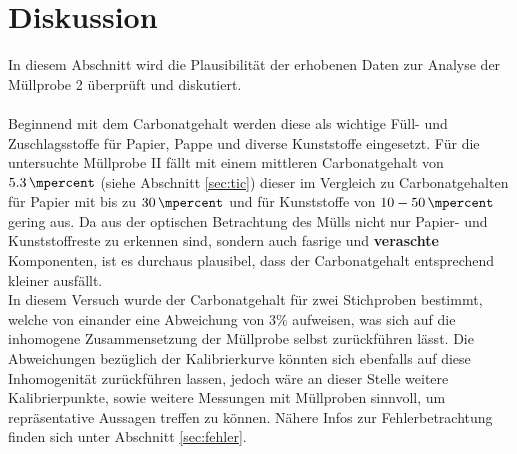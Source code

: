 \chapter{Diskussion}
\label{sec:diskussion}

In diesem Abschnitt wird die Plausibilität der erhobenen Daten zur Analyse der Müllprobe 2 überprüft und diskutiert.\\ \\
Beginnend mit dem Carbonatgehalt werden diese als wichtige Füll- und Zuschlagsstoffe für Papier, Pappe und diverse Kunststoffe eingesetzt. Für die untersuchte Müllprobe II fällt mit einem mittleren Carbonatgehalt von $\SI{5,3}{\mpercent}$ (siehe Abschnitt \ref{sec:tic}) dieser im Vergleich zu Carbonatgehalten für Papier mit bis zu $\SI{30}{\mpercent}$ \cite{Wikipedia.21.11.2019} und für Kunststoffe von $10 - \SI{50}{\mpercent}$ \cite{PolymerServiceGmbHMerseburg.13.08.2019} gering aus. Da aus der optischen Betrachtung des Mülls nicht nur Papier- und Kunststoffreste zu erkennen sind, sondern auch fasrige und \textbf{ veraschte} Komponenten, ist es durchaus plausibel, dass der Carbonatgehalt entsprechend kleiner ausfällt. \\
In diesem Versuch wurde der Carbonatgehalt für zwei Stichproben bestimmt, welche von einander eine Abweichung von 3\% aufweisen, was sich auf die inhomogene Zusammensetzung der Müllprobe selbst zurückführen lässt.\linebreak
Die Abweichungen bezüglich der Kalibrierkurve könnten sich ebenfalls auf diese Inhomogenität zurückführen lassen, jedoch wäre an dieser Stelle weitere Kalibrierpunkte, sowie weitere Messungen mit Müllproben sinnvoll, um repräsentative Aussagen treffen zu können. Nähere Infos zur Fehlerbetrachtung finden sich unter Abschnitt \ref{sec:fehler}.\\

